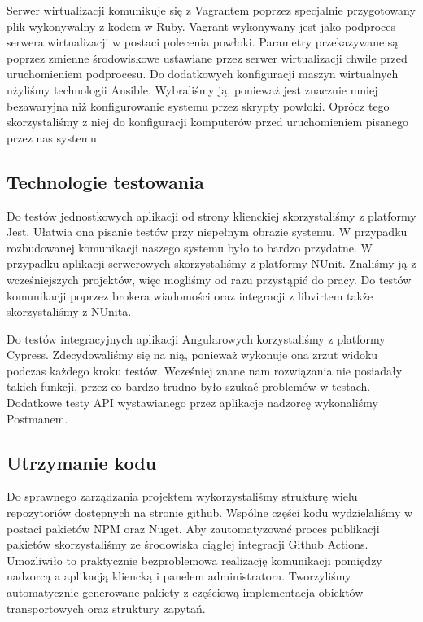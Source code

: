 \documentclass[../opis-rozwiazania.tex]{subfiles}
\begin{document}
Serwer wirtualizacji komunikuje się z Vagrantem poprzez specjalnie przygotowany plik wykonywalny z kodem w Ruby.
Vagrant wykonywany jest jako podproces serwera wirtualizacji w postaci polecenia powłoki.
Parametry przekazywane są poprzez zmienne środowiskowe ustawiane przez serwer wirtualizacji chwile przed uruchomieniem podprocesu.
Do dodatkowych konfiguracji maszyn wirtualnych użyliśmy technologii Ansible.
Wybraliśmy ją, ponieważ jest znacznie mniej bezawaryjna niż konfigurowanie systemu przez skrypty powłoki.
Oprócz tego skorzystaliśmy z niej do konfiguracji komputerów przed uruchomieniem pisanego przez nas systemu.

\subsection{Technologie testowania}
Do testów jednostkowych aplikacji od strony klienckiej skorzystaliśmy z platformy Jest.
Ułatwia ona pisanie testów przy niepełnym obrazie systemu. W przypadku rozbudowanej komunikacji naszego systemu było to bardzo przydatne.
W przypadku aplikacji serwerowych skorzystaliśmy z platformy NUnit.
Znaliśmy ją z wcześniejszych projektów, więc mogliśmy od razu przystąpić do pracy.
Do testów komunikacji poprzez brokera wiadomości oraz integracji z libvirtem także skorzystaliśmy z NUnita.

Do testów integracyjnych aplikacji Angularowych korzystaliśmy z platformy Cypress.
Zdecydowaliśmy się na nią, ponieważ wykonuje ona zrzut widoku podczas każdego kroku testów.
Wcześniej znane nam rozwiązania nie posiadały takich funkcji, przez co bardzo trudno było szukać problemów w testach.
Dodatkowe testy API wystawianego przez aplikacje nadzorcę wykonaliśmy Postmanem.

\subsection{Utrzymanie kodu}
Do sprawnego zarządzania projektem wykorzystaliśmy strukturę wielu repozytoriów dostępnych na stronie github.
Wspólne części kodu wydzielaliśmy w postaci pakietów NPM oraz Nuget.
Aby zautomatyzować proces publikacji pakietów skorzystaliśmy ze środowiska ciągłej integracji Github Actions.
Umożliwiło to praktycznie bezproblemowa realizację komunikacji pomiędzy nadzorcą a aplikacją kliencką i panelem administratora.
Tworzyliśmy automatycznie generowane pakiety z częściową implementacja obiektów transportowych oraz struktury zapytań.
\end{document}

